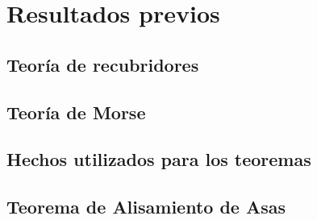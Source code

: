 
\chapter{Resultados previos}


\section{Teoría de recubridores}

	
	\newpage

\section{Teoría de Morse}

	
	\newpage
	
\section{Hechos utilizados para los teoremas}

	
	\newpage

\section{Teorema de Alisamiento de Asas}

	

\endinput
